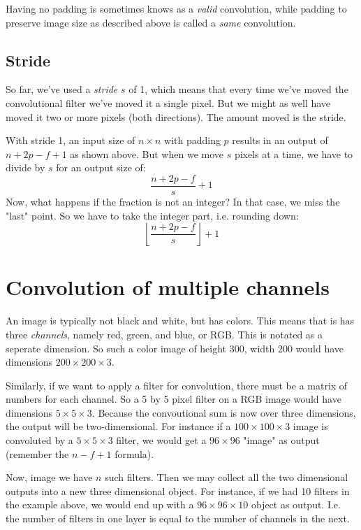 \documentclass[12pt, a4paper]{article}
\numberwithin{equation}{section}
\begin{document}
Having no padding is sometimes knows as a \textit{valid} convolution, while padding to preserve image size as described above is called a \textit{same} convolution.

\subsection{Stride}
So far, we've used a \textit{stride} $s$ of 1, which means that every time we've moved the convolutional filter we've moved it a single pixel. But we might as well have moved it two or more pixels (both directions). The amount moved is the stride.

With stride 1, an input size of $n\times n$ with padding $p$ results in an output of $n+2p-f+1$ as shown above. But when we move $s$ pixels at a time, we have to divide by $s$ for an output size of:
\begin{equation}
\frac{n+2p-f}{s}+1
\end{equation}
Now, what happens if the fraction is not an integer? In that case, we miss the "last" point. So we have to take the integer part, i.e. rounding down:
\begin{equation}
\left\lfloor\frac{n+2p-f}{s}\right\rfloor+1
\end{equation}

\section{Convolution of multiple channels}
An image is typically not black and white, but has colors. This means that is has three \textit{channels}, namely red, green, and blue, or RGB. This is notated as a seperate dimension. So such a color image of height 300, width 200 would have dimensions $200\times 200\times 3$.

Similarly, if we want to apply a filter for convolution, there must be a matrix of numbers for each channel. So a 5 by 5 pixel filter on a RGB image would have dimensions $5\times 5\times 3$. Because the convoutional sum is now over three dimensions, the output will be two-dimensional. For instance if a $100\times 100\times 3$ image is convoluted by a $5\times 5\times 3$ filter, we would get a $96\times 96$ "image" as output (remember the $n-f+1$ formula).

Now, image we have $n$ such filters. Then we may collect all the two dimensional outputs into a new three dimensional object. For instance, if we had 10 filters in the example above, we would end up with a $96\times 96\times 10$ object as output. I.e. the number of filters in one layer is equal to the number of channels in the next.
\end{document}
